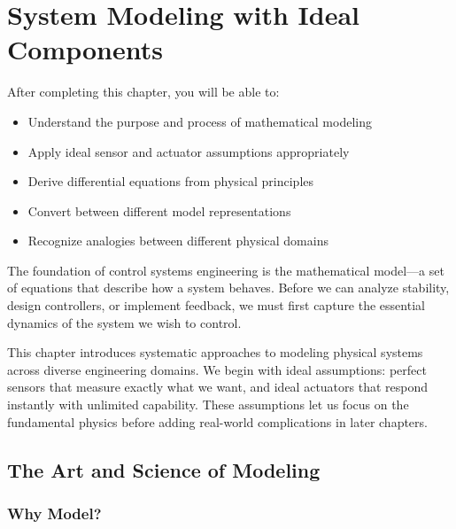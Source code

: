 
\chapter{System Modeling with Ideal Components}
\label{ch:modeling}

\begin{keyconceptbox}[title=Learning Objectives]
After completing this chapter, you will be able to:
\begin{itemize}
    \item Understand the purpose and process of mathematical modeling
    \item Apply ideal sensor and actuator assumptions appropriately
    \item Derive differential equations from physical principles
    \item Convert between different model representations
    \item Recognize analogies between different physical domains
\end{itemize}
\end{keyconceptbox}

The foundation of control systems engineering is the mathematical model---a set of equations that describe how a system behaves. Before we can analyze stability, design controllers, or implement feedback, we must first capture the essential dynamics of the system we wish to control.

This chapter introduces systematic approaches to modeling physical systems across diverse engineering domains. We begin with ideal assumptions: perfect sensors that measure exactly what we want, and ideal actuators that respond instantly with unlimited capability. These assumptions let us focus on the fundamental physics before adding real-world complications in later chapters.

\section{The Art and Science of Modeling}
\label{sec:modeling_philosophy}

\subsection{Why Model?}

